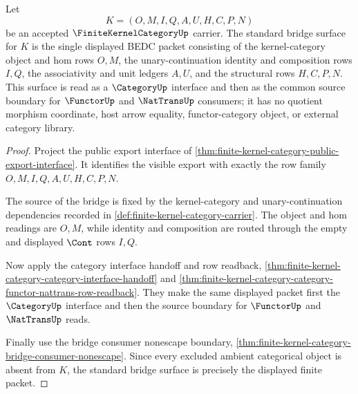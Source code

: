 \begin{theorem}
\label{thm:finite-kernel-category-standard-bridge-surface}
Let
$$
K=(O,M,I,Q,A,U,H,C,P,N)
$$
be an accepted $\FiniteKernelCategoryUp$ carrier. The standard bridge surface
for $K$ is the single displayed BEDC packet consisting of the
kernel-category object and hom rows $O,M$, the unary-continuation identity and
composition rows $I,Q$, the associativity and unit ledgers $A,U$, and the
structural rows $H,C,P,N$. This surface is read as a $\CategoryUp$ interface
and then as the common source boundary for $\FunctorUp$ and $\NatTransUp$
consumers; it has no quotient morphism coordinate, host arrow equality,
functor-category object, or external category library.
\end{theorem}
\begin{proof}
Project the public export interface of
\autoref{thm:finite-kernel-category-public-export-interface}. It identifies
the visible export with exactly the row family $O,M,I,Q,A,U,H,C,P,N$.

The source of the bridge is fixed by the kernel-category and
unary-continuation dependencies recorded in
\autoref{def:finite-kernel-category-carrier}. The object and hom readings are
$O,M$, while identity and composition are routed through the empty and
displayed $\Cont$ rows $I,Q$.

Now apply the category interface handoff and row readback,
\autoref{thm:finite-kernel-category-category-interface-handoff} and
\autoref{thm:finite-kernel-category-category-functor-nattrans-row-readback}.
They make the same displayed packet first the $\CategoryUp$ interface and then
the source boundary for $\FunctorUp$ and $\NatTransUp$ reads.

Finally use the bridge consumer nonescape boundary,
\autoref{thm:finite-kernel-category-bridge-consumer-nonescape}. Since every
excluded ambient categorical object is absent from $K$, the standard bridge
surface is precisely the displayed finite packet.
\end{proof}

